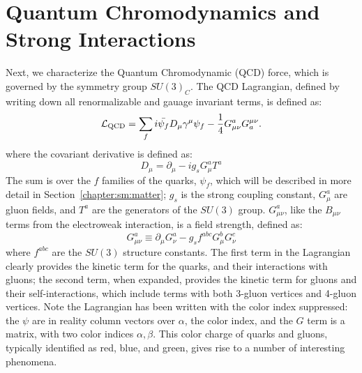 \section{Quantum Chromodynamics and Strong Interactions}

Next, we characterize the Quantum Chromodynamic (QCD) force, which is governed by the symmetry group $SU(3)_C$. The QCD Lagrangian, defined by writing down all renormalizable and gauage invariant terms, is defined as:
%
\begin{equation}
\mathcal{L}_{\mathrm{QCD}} = \sum_f i \bar{\psi_f} D_\mu \gamma^\mu \psi_f - \frac{1}{4} G_{\mu\nu}^a G_{a}^{\mu\nu}.
\end{equation}
%
where the covariant derivative is defined as:
%
\begin{equation}
D_\mu = \partial_\mu - i g_s G_\mu^a T^a
\end{equation}
%
The sum is over the $f$ families of the quarks, $\psi_f$, which will be described in more detail in Section~\ref{chapter:sm:matter}; $g_s$ is the strong coupling constant, $G_\mu^a$ are gluon fields, and $T^a$ are the generators of the $SU(3)$ group. $G_{\mu\nu}^a$, like the $B_{\mu\nu}$ terms from the electroweak interaction, is a field strength, defined as:
%
\begin{equation}
G_{\mu\nu}^a \equiv \partial_\mu G_\nu^a - g_s f^{abc}G_\mu^b G_\nu^c
\end{equation}
%
where $f^{abc}$ are the $SU(3)$ structure constants. The first term in the Lagrangian clearly provides the kinetic term for the quarks, and their interactions with gluons; the second term, when expanded, provides the kinetic term for gluons and their self-interactions, which include terms with both 3-gluon vertices and 4-gluon vertices. Note the Lagrangian has been written with the color index suppressed: the $\psi$ are in reality column vectors over $\alpha$, the color index, and the $G$ term is a matrix, with two color indices $\alpha, \beta$. This color charge of quarks and gluons, typically identified as red, blue, and green, gives rise to a number of interesting phenomena. %

